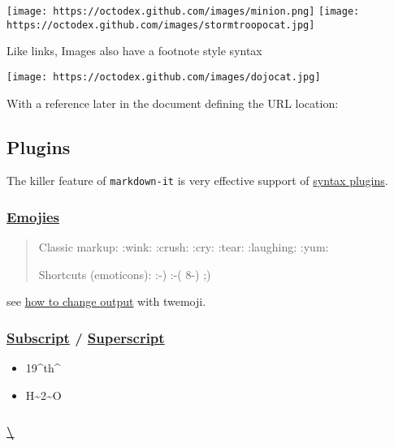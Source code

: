 \documentclass[]{article}
\providecommand{\tightlist}{%
  \setlength{\itemsep}{0pt}\setlength{\parskip}{0pt}}
\begin{document}
\texttt{[image: https://octodex.github.com/images/minion.png]}
\texttt{[image: https://octodex.github.com/images/stormtroopocat.jpg]}

Like links, Images also have a footnote style syntax

\texttt{[image: https://octodex.github.com/images/dojocat.jpg]}

With a reference later in the document defining the URL location:

\subsection{Plugins}

The killer feature of \texttt{markdown-it} is very effective support of
\href{https://www.npmjs.org/browse/keyword/markdown-it-plugin}{syntax
plugins}.

\subsubsection{\texorpdfstring{\href{https://github.com/markdown-it/markdown-it-emoji}{Emojies}}{Emojies}}

\begin{quote}
Classic markup: :wink: :crush: :cry: :tear: :laughing: :yum:

Shortcuts (emoticons): :-) :-( 8-) ;)
\end{quote}

see
\href{https://github.com/markdown-it/markdown-it-emoji\#change-output}{how
to change output} with twemoji.

\subsubsection{\texorpdfstring{\href{https://github.com/markdown-it/markdown-it-sub}{Subscript}
/
\href{https://github.com/markdown-it/markdown-it-sup}{Superscript}}{Subscript / Superscript}}

\begin{itemize}
\tightlist
\item
  19\^{}th\^{}
\item
  H\textasciitilde{}2\textasciitilde{}O
\end{itemize}

\subsubsection{\texorpdfstring{\href{https://github.com/markdown-it/markdown-it-ins}{\textbackslash{}}}{\textbackslash{}}}
\end{document}
